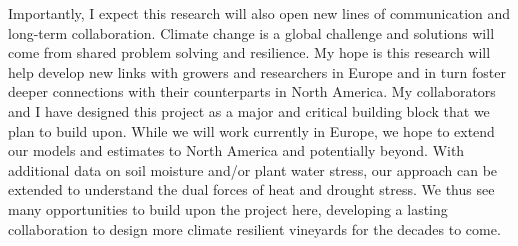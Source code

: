 \documentclass[11pt,letter,oneside]{article}
\begin{document}
Importantly, I expect this research will also open new lines of communication and long-term collaboration. Climate change is a global challenge and solutions will come from shared problem solving and resilience. My hope is this research will help develop new links with growers and researchers in Europe and in turn foster deeper connections with their counterparts in North America. My collaborators and I have designed this project as a major and critical building block that we plan to build upon. While we will work currently in Europe, we hope to extend our models and estimates to North America and potentially beyond. With additional data on soil moisture and/or plant water stress, our approach can be extended to understand the dual forces of heat and drought stress. We thus see many opportunities to build upon the project here, developing a lasting collaboration to design more climate resilient vineyards for the decades to come. 



\newpage
\setcounter{page}{1}
\def\section*#1{}




\end{document}

